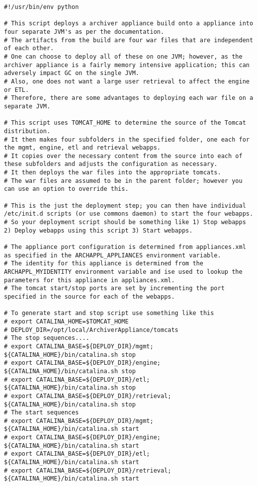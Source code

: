 \documentclass[11pt
  , a4paper
  , article
  , oneside
]{memoir}
\begin{document}
\begin{lstlisting}[style=termstyle]
#!/usr/bin/env python

# This script deploys a archiver appliance build onto a appliance into four separate JVM's as per the documentation.
# The artifacts from the build are four war files that are independent of each other. 
# One can choose to deploy all of these on one JVM; however, as the archiver appliance is a fairly memory intensive application; this can adversely impact GC on the single JVM.
# Also, one does not want a large user retrieval to affect the engine or ETL.
# Therefore, there are some advantages to deploying each war file on a separate JVM.

# This script uses TOMCAT_HOME to determine the source of the Tomcat distribution.
# It then makes four subfolders in the specified folder, one each for the mgmt, engine, etl and retrieval webapps.
# It copies over the necessary content from the source into each of these subfolders and adjusts the configuration as necessary.
# It then deploys the war files into the appropriate tomcats.
# The war files are assumed to be in the parent folder; however you can use an option to override this. 

# This is the just the deployment step; you can then have individual /etc/init.d scripts (or use commons daemon) to start the four webapps.
# So your deployment script should be something like 1) Stop webapps 2) Deploy webapps using this script 3) Start webapps.

# The appliance port configuration is determined from appliances.xml as specified in the ARCHAPPL_APPLIANCES environment variable.
# The identity for this appliance is determined from the ARCHAPPL_MYIDENTITY environment variable and ise used to lookup the parameters for this appliance in appliances.xml.
# The tomcat start/stop ports are set by incrementing the port specified in the source for each of the webapps.

# To generate start and stop script use something like this
# export CATALINA_HOME=$TOMCAT_HOME
# DEPLOY_DIR=/opt/local/ArchiverAppliance/tomcats
# The stop sequences....
# export CATALINA_BASE=${DEPLOY_DIR}/mgmt; ${CATALINA_HOME}/bin/catalina.sh stop 
# export CATALINA_BASE=${DEPLOY_DIR}/engine; ${CATALINA_HOME}/bin/catalina.sh stop 
# export CATALINA_BASE=${DEPLOY_DIR}/etl; ${CATALINA_HOME}/bin/catalina.sh stop 
# export CATALINA_BASE=${DEPLOY_DIR}/retrieval; ${CATALINA_HOME}/bin/catalina.sh stop 
# The start sequences
# export CATALINA_BASE=${DEPLOY_DIR}/mgmt; ${CATALINA_HOME}/bin/catalina.sh start
# export CATALINA_BASE=${DEPLOY_DIR}/engine; ${CATALINA_HOME}/bin/catalina.sh start
# export CATALINA_BASE=${DEPLOY_DIR}/etl; ${CATALINA_HOME}/bin/catalina.sh start
# export CATALINA_BASE=${DEPLOY_DIR}/retrieval; ${CATALINA_HOME}/bin/catalina.sh start


\end{lstlisting}
\end{document}
